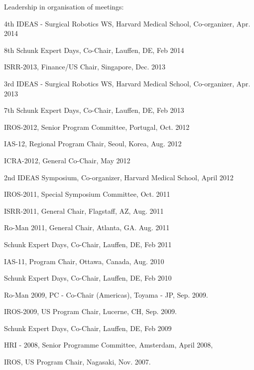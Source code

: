 \documentclass{article}
\begin{document}
\begin{cv}
\begin{cvlist}{Leadership in organisation of meetings:}
  \item 4th IDEAS - Surgical Robotics WS, Harvard Medical School, Co-organizer,
  \cftdotfill{\cftdotsep} Apr. 2014
  \item 8th Schunk Expert Days, Co-Chair, Lauffen, DE, \cftdotfill{\cftdotsep}
  Feb 2014
  \item ISRR-2013, Finance/US Chair, Singapore, \cftdotfill{\cftdotsep} Dec.
  2013
  \item 3rd IDEAS - Surgical Robotics WS, Harvard Medical School, Co-organizer,
  \cftdotfill{\cftdotsep} Apr. 2013
  \item 7th Schunk Expert Days, Co-Chair, Lauffen, DE, \cftdotfill{\cftdotsep}
  Feb 2013
  \item IROS-2012, Senior Program Committee, Portugal,\cftdotfill{\cftdotsep}
  Oct. 2012
  \item IAS-12, Regional Program Chair, Seoul, Korea, \cftdotfill{\cftdotsep}
  Aug. 2012
  \item ICRA-2012, General Co-Chair, \cftdotfill{\cftdotsep} May 2012
  \item 2nd IDEAS Symposium, Co-organizer, Harvard Medical School,
  \cftdotfill{\cftdotsep} April 2012
  \item IROS-2011, Special Symposium Committee, \cftdotfill{\cftdotsep} Oct.
  2011
  \item ISRR-2011, General Chair, Flagstaff, AZ, \cftdotfill{\cftdotsep} Aug.
  2011
  \item Ro-Man 2011, General Chair, Atlanta, GA. \cftdotfill{\cftdotsep} Aug.
  2011
  \item Schunk Expert Days, Co-Chair, Lauffen, DE, \cftdotfill{\cftdotsep} Feb
  2011
  \item IAS-11, Program Chair, Ottawa, Canada, \cftdotfill{\cftdotsep} Aug. 2010
  \item Schunk Expert Days, Co-Chair, Lauffen, DE, \cftdotfill{\cftdotsep} Feb
  2010
  \item Ro-Man 2009, PC - Co-Chair (Americas), Toyama - JP,
  \cftdotfill{\cftdotsep} Sep. 2009.
  \item IROS-2009, US Program Chair, Lucerne, CH, \cftdotfill{\cftdotsep} Sep.
  2009.
  \item Schunk Expert Days, Co-Chair, Lauffen, DE, \cftdotfill{\cftdotsep} Feb
  2009
  \item HRI - 2008, Senior Programme Committee, Amsterdam,
  \cftdotfill{\cftdotsep} April 2008,
  \item IROS, US Program Chair, Nagasaki, \cftdotfill{\cftdotsep} Nov. 2007.

\end{cvlist}
\end{cv}
\end{document}
